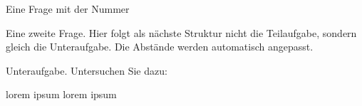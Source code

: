 \documentclass{../exam2e}
\begin{document}
\gradetable[h][questions]


\begin{questions}%

\begin{question}[1]
	Eine Frage mit der Nummer \thequestion
{}
\end{question}%

\question[2] Eine zweite Frage. Hier folgt als nächste Struktur nicht die Teilaufgabe, sondern gleich die Unteraufgabe. Die Abstände werden automatisch angepasst.
\begin{subparts}
		\subpart Unteraufgabe. Untersuchen Sie  dazu:
	\begin{subsubparts}
		\subsubpart lorem ipsum
		\subsubpart lorem ipsum
	\end{subsubparts}
\end{subparts}




\end{questions}%
\end{document}
